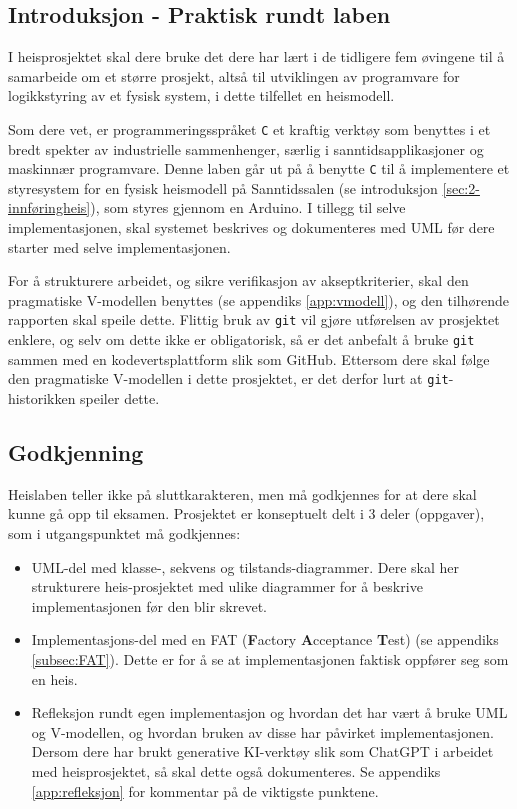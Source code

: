 
\begin{alphasection}

\section{Introduksjon - Praktisk rundt laben}
I heisprosjektet skal dere bruke det dere har lært i de tidligere fem øvingene til å samarbeide om et større prosjekt, altså til utviklingen av programvare for logikkstyring av et fysisk system, i dette tilfellet en heismodell.

Som dere vet, er programmeringsspråket \verb|C| et kraftig verktøy som benyttes i et bredt spekter av industrielle sammenhenger, særlig i sanntidsapplikasjoner og maskinnær programvare. Denne laben går ut på å benytte \verb|C| til å implementere et styresystem for en fysisk heismodell på Sanntidssalen (se introduksjon \ref{sec:2-innføringheis}), som styres gjennom en Arduino. I tillegg til selve implementasjonen, skal systemet beskrives og dokumenteres med UML før dere starter med selve implementasjonen.

For å strukturere arbeidet, og sikre verifikasjon av akseptkriterier, skal den pragmatiske V-modellen benyttes (se appendiks \ref{app:vmodell}), og den tilhørende rapporten skal speile dette. Flittig bruk av \verb|git| vil gjøre utførelsen av prosjektet enklere, og selv om dette ikke er obligatorisk, så er det anbefalt å bruke \verb|git| sammen med en kodevertsplattform slik som GitHub. Ettersom dere skal følge den pragmatiske V-modellen i dette prosjektet, er det derfor lurt at \verb|git|-historikken speiler dette.

\subsection*{Godkjenning}

Heislaben teller ikke på sluttkarakteren, men må godkjennes for at dere skal kunne gå opp til eksamen. Prosjektet er konseptuelt delt i 3 deler (oppgaver), som i utgangspunktet må godkjennes:
\begin{itemize}
    \item UML-del med klasse-, sekvens og tilstands-diagrammer. Dere skal her strukturere heis-prosjektet med ulike diagrammer for å beskrive implementasjonen før den blir skrevet.
    \item Implementasjons-del med en FAT (\textbf{F}actory \textbf{A}cceptance \textbf{T}est) (se appendiks \ref{subsec:FAT}). Dette er for å se at implementasjonen faktisk oppfører seg som en heis.
    \item Refleksjon rundt egen implementasjon og hvordan det har vært å bruke UML og V-modellen, og hvordan bruken av disse har påvirket implementasjonen. Dersom dere har brukt generative KI-verktøy slik som ChatGPT i arbeidet med heisprosjektet, så skal dette også dokumenteres. Se appendiks \ref{app:refleksjon} for kommentar på de viktigste punktene.
\end{itemize}


\end{alphasection}
